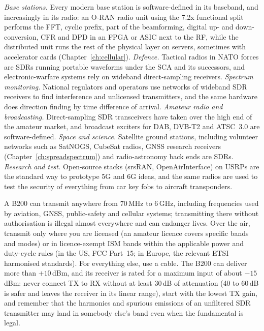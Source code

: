 \begin{inpractice}
\emph{Base stations.} Every modern base station is software-defined in its baseband, and increasingly in
its radio: an O-RAN radio unit using the 7.2x functional split performs the FFT, cyclic prefix, part of the
beamforming, digital up- and down-conversion, CFR and DPD in an FPGA or ASIC next to the RF, while the
distributed unit runs the rest of the physical layer on servers, sometimes with accelerator cards
(Chapter~\ref{ch:cellular}). \emph{Defence.} Tactical radios in NATO forces are SDRs running portable
waveforms under the SCA and its successors, and electronic-warfare systems rely on wideband
direct-sampling receivers. \emph{Spectrum monitoring.} National regulators and operators use networks of
wideband SDR receivers to find interference and unlicensed transmitters, and the same hardware does
direction finding by time difference of arrival. \emph{Amateur radio and broadcasting.} Direct-sampling SDR
transceivers have taken over the high end of the amateur market, and broadcast exciters for DAB, DVB-T2 and
ATSC~3.0 are software-defined. \emph{Space and science.} Satellite ground stations, including volunteer
networks such as SatNOGS, CubeSat radios, GNSS research receivers (Chapter~\ref{ch:spreadspectrum}) and
radio-astronomy back ends are SDRs. \emph{Research and test.} Open-source stacks (srsRAN,
OpenAirInterface) on USRPs are the standard way to prototype 5G and 6G ideas, and the same radios are
used to test the security of everything from car key fobs to aircraft transponders.
\end{inpractice}

\begin{pitfall}
A B200 can transmit anywhere from 70\,MHz to 6\,GHz, including frequencies used by aviation, GNSS,
public-safety and cellular systems; transmitting there without authorisation is illegal almost
everywhere and can endanger lives. Over the air, transmit only where you are licensed (an amateur licence
covers specific bands and modes) or in licence-exempt ISM bands within the applicable power and duty-cycle
rules (in the US, FCC Part~15; in Europe, the relevant ETSI harmonised standards). For everything else, use
a cable. The B200 can deliver more than $+10$\,dBm, and its receiver is rated for a maximum input of about
$-15$\,dBm: never connect TX to RX without at least 30\,dB of attenuation (40 to 60\,dB is safer and leaves
the receiver in its linear range), start with the lowest TX gain, and remember that the harmonics and
spurious emissions of an unfiltered SDR transmitter may land in somebody else's band even when the
fundamental is legal.
\end{pitfall}

